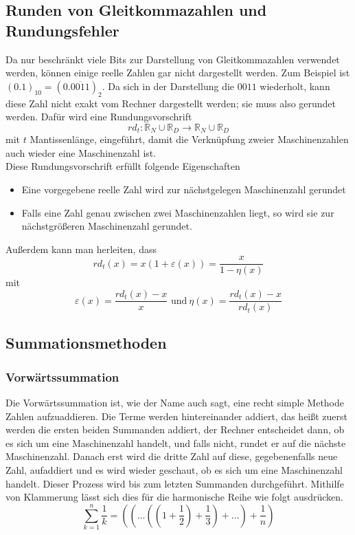 \documentclass{scrartcl}
\begin{document}
\subsection{Runden von Gleitkommazahlen und Rundungsfehler}
Da nur beschränkt viele Bits zur Darstellung von Gleitkommazahlen verwendet
werden, können einige reelle Zahlen gar nicht dargestellt werden.
Zum Beispiel ist \\ \((0.1)_{10} = (0.
\overline{0011})_2 \).
Da sich in der Darstellung die \(0011\) wiederholt, kann diese Zahl nicht exakt
vom Rechner dargestellt werden; sie muss also gerundet werden.
Dafür wird eine Rundungsvorschrift \[rd_t: \mathbb{R}_N \cup \mathbb{R}_D
    \rightarrow \mathbb{R}_N \cup \mathbb{R}_D\] mit \(t\) Mantissenlänge,
eingeführt, damit die Verknüpfung zweier Maschinenzahlen auch wieder eine
Maschinenzahl ist.
\\
Diese Rundungsvorschrift erfüllt folgende Eigenschaften
\begin{itemize}
    \item Eine vorgegebene reelle Zahl wird zur nächstgelegen Maschinenzahl gerundet
    \item Falls eine Zahl genau zwischen zwei Maschinenzahlen liegt, so wird sie zur nächstgrößeren Maschinenzahl gerundet.
\end{itemize}
Außerdem kann man herleiten, dass \[rd_t(x) = x(1+\varepsilon(x)) =
    \frac{x}{1-\eta(x)}\] mit \[\varepsilon(x) = \frac{rd_t(x) - x}{x} \text{ und}\
    \eta(x) = \frac{rd_t(x) - x}{rd_t(x)} \]

\subsection{Summationsmethoden} \subsubsection{Vorwärtssummation} Die
Vorwärtssummation ist, wie der Name auch sagt, eine recht simple Methode Zahlen
aufzuaddieren.
Die Terme werden hintereinander addiert, das heißt zuerst werden die ersten
beiden Summanden addiert, der Rechner entscheidet dann, ob es sich um eine
Maschinenzahl handelt, und falls nicht, rundet er auf die nächste
Maschinenzahl.
Danach erst wird die dritte Zahl auf diese, gegebenenfalls neue Zahl,
aufaddiert und es wird wieder geschaut, ob es sich um eine Maschinenzahl
handelt.
Dieser Prozess wird bis zum letzten Summanden durchgeführt.
Mithilfe von Klammerung lässt sich dies für die harmonische Reihe wie folgt
ausdrücken.
\[ \sum_{k=1}^{n} \frac{1}{k} = ((...((1+\frac{1}{2})+\frac{1}{3})+ ...) + \frac{1}{n}) \]
\end{document}
